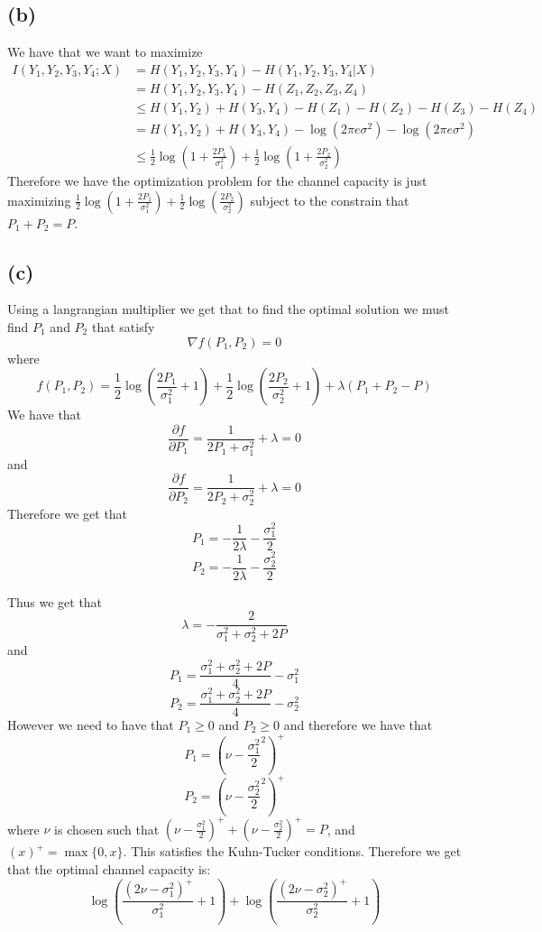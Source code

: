 \subsection*{(b)}
We have that we want to maximize 
\begin{align*}
    I(Y_1,Y_2,Y_3,Y_4;X)&=H(Y_1,Y_2,Y_3,Y_4)-H(Y_1,Y_2,Y_3,Y_4|X)\\
    &=H(Y_1,Y_2,Y_3,Y_4)-H(Z_1,Z_2,Z_3,Z_4)\\
    &\leq H(Y_1,Y_2)+H(Y_3,Y_4)-H(Z_1)-H(Z_2)-H(Z_3)-H(Z_4)\\
    &=H(Y_1,Y_2)+H(Y_3,Y_4)-\log(2\pi e\sigma^2)-\log(2\pi e\sigma^2)\\
    &\leq \frac{1}{2}\log\left(1+\frac{2P_1}{\sigma_1^2}\right)
    +\frac{1}{2}\log\left(1+\frac{2P_2}{\sigma_2^2}\right)
\end{align*}
Therefore we have the optimization problem for the channel capacity is just
maximizing $\frac{1}{2}\log\left(1+\frac{2P_1}{\sigma_1^2}\right)
+\frac{1}{2}\log\left(\frac{2P_2}{\sigma_2^2}\right)$ subject to 
the constrain that $P_1+P_2=P$.
\subsection*{(c)}
Using a langrangian multiplier we get that to find the optimal solution we must 
find $P_1$ and $P_2$ that satisfy 
$$\nabla f(P_1,P_2)=0$$
where 
$$f(P_1,P_2)=\frac{1}{2}\log\left(\frac{2P_1}{\sigma_1^2}+1\right)+\frac{1}{2}
\log\left(\frac{2P_2}{\sigma_2^2}+1\right)+\lambda(P_1+P_2-P)$$
We have that 
$$\frac{\partial f}{\partial P_1}=\frac{1}{2P_1+\sigma_1^2}+\lambda=0$$
and
$$\frac{\partial f}{\partial P_2}=\frac{1}{2P_2+\sigma_2^2}+\lambda=0$$
Therefore we get that 
$$P_1=-\frac{1}{2\lambda}-\frac{\sigma_1^2}{2}$$
$$P_2=-\frac{1}{2\lambda}-\frac{\sigma_2^2}{2}$$

Thus we get that 
$$\lambda=-\frac{2}{\sigma^2_1+\sigma^2_2+2P}$$
and
$$P_1=\frac{\sigma^2_1+\sigma^2_2+2P}{4}-\sigma_1^2$$
$$P_2=\frac{\sigma^2_1+\sigma^2_2+2P}{4}-\sigma_2^2$$
However we need to have that $P_1\geq 0$ and $P_2\geq 0$ and therefore we have that 
$$P_1=\boxed{\left(\nu-\frac{\sigma_1^2}{2}^2\right)^{+}}$$
$$P_2=\boxed{\left(\nu-\frac{\sigma_2^2}{2}^2\right)^{+}}$$
where $\nu$ is chosen such that $(\nu-\frac{\sigma_1^2}{2})^{+}+(\nu-\frac{\sigma_2^2}{2})^{+}=P$, and 
$(x)^{+}=\max\{0,x\}$. This satisfies the Kuhn-Tucker conditions. Therefore we get that
the optimal channel capacity is:
$$\boxed{\log\left(\frac{(2\nu-\sigma_1^2)^{+}}{\sigma_1^2}+1\right)+
\log\left(\frac{(2\nu-\sigma_2^2)^{+}}{\sigma_2^2}+1\right)}$$
